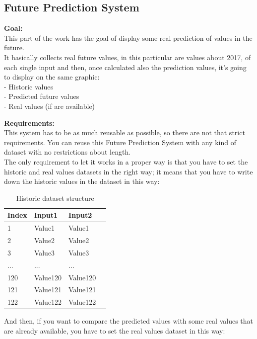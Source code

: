 \newpage
\subsection{Future Prediction System}
\textbf{Goal:}\\ 
This part of the work has the goal of display some real prediction of values in the future. \\
It basically collects real future values, in this particular are values about 2017, of each single input and then, once calculated also the prediction values, it's going to display on the same graphic:\\
- Historic values\\
- Predicted future values\\
- Real values (if are available)

\textbf{Requirements:}\\
This system has to be as much reusable as possible, so there are not that strict requirements. You can reuse this Future Prediction System with any kind of dataset with no restrictions about length. \\
The only requirement to let it works in a proper way is that you have to set the historic and real values datasets in the right way; it means that you have to write down the historic values in the dataset in this way:


\begin{table}[ht] 
    \centering 
    \begin{tabular}{ | l | l | l | p{5cm} |}
        \hline
        Index 	& Input1 	& Input2			\\ \hline
          	1 	& Value1 	& Value1			\\ \hline
          	2 	& Value2 	& Value2			\\ \hline
          	3 	& Value3	& Value3 		\\ \hline
          	... & ... 		& ...				\\ \hline
           	120 & Value120 & Value120	\\ \hline
          	121 & Value121 & Value121	\\ \hline
 			122 & Value122 & Value122	\\ \hline
    \end{tabular}
    \caption{Historic dataset structure}
    \label{table: pred_historic_values} 
\end{table} 

And then, if you want to compare the predicted values with some real values that are already available, you have to set the real values dataset in this way:


